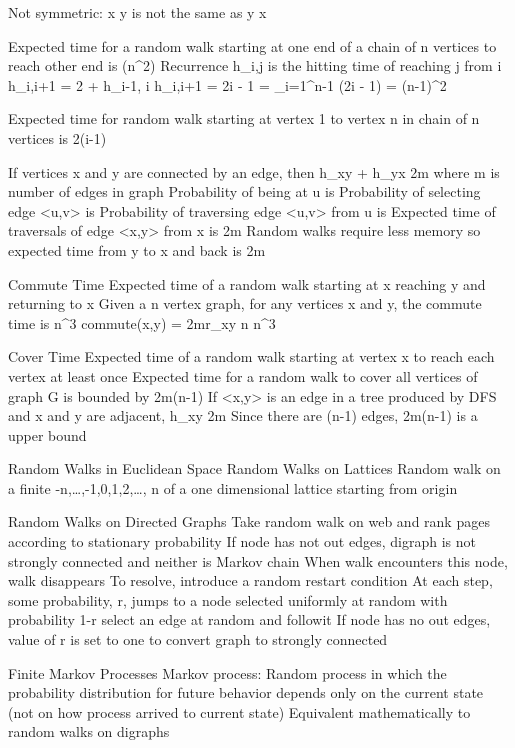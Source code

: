		Not symmetric: x \rightarrow y is not the same as y \rightarrow x

		Expected time for a random walk starting at one end of a chain of n vertices to reach other end is \theta (n^{2})
			Recurrence h_{i,j} is the hitting time of reaching j from i
				h_{i,i+1} = 2 + h_{i-1, i}
				h_{i,i+1} = 2i - 1
				= \sum_{i=1}^{n-1} (2i - 1)
				= (n-1)^{2}

		Expected time for random walk starting at vertex 1 to vertex n in chain of n vertices is 2(i-1)

		If vertices x and y are connected by an edge, then h_{xy} + h_{yx} \leq 2m where m is number of edges in graph
			Probability of being at u is 
			Probability of selecting edge <u,v> is 
			Probability of traversing edge <u,v> from u is 
			Expected time of traversals of edge <x,y> from x is 2m
			Random walks require less memory so expected time from y to x and back is 2m

	Commute Time
		Expected time of a random walk starting at x reaching y and returning to x
			Given a n vertex graph, for any vertices x and y, the commute time is \leq n^{3}
				commute(x,y) = 2mr_{xy}  n \approx n^{3}

	Cover Time
		Expected time of a random walk starting at vertex x to reach each vertex at least once
			Expected time for a random walk to cover all vertices of graph G is bounded by 2m(n-1)
				If <x,y> is an edge in a tree produced by DFS and x and y are adjacent, h_{xy} \leq 2m
				Since there are (n-1) edges, 2m(n-1) is a upper bound

Random Walks in Euclidean Space
	Random Walks on Lattices
		Random walk on a finite -n,\dots,-1,0,1,2,\dots, n of a one dimensional lattice starting from origin

Random Walks on Directed Graphs
	Take random walk on web and rank pages according to stationary probability
	If node has not out edges, digraph is not strongly connected and neither is Markov chain
		When walk encounters this node, walk disappears
		To resolve, introduce a random restart condition
			At each step, some probability, r, jumps to a node selected uniformly at random with probability 1-r select an edge at random and followit
			If node has no out edges, value of r is set to one to convert graph to strongly connected

Finite Markov Processes
	Markov process: Random process in which the probability distribution for future behavior depends only on the current state (not on how process arrived to current state)
		Equivalent mathematically to random walks on digraphs

